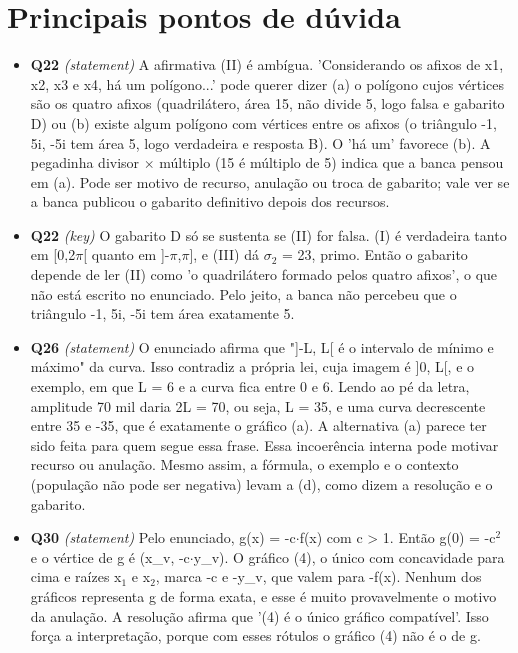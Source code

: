 \documentclass{article}%
\begin{document}
\section*{Principais pontos de dúvida}%
\begin{itemize}%
\item%
\textbf{Q22} \textit{(statement)} A afirmativa (II) é ambígua. 'Considerando os afixos de x1, x2, x3 e x4, há um polígono...' pode querer dizer (a) o polígono cujos vértices são os quatro afixos (quadrilátero, área 15, não divide 5, logo falsa e gabarito D) ou (b) existe algum polígono com vértices entre os afixos (o triângulo -1, 5i, -5i tem área 5, logo verdadeira e resposta B). O 'há um' favorece (b). A pegadinha divisor $\times$ múltiplo (15 é múltiplo de 5) indica que a banca pensou em (a). Pode ser motivo de recurso, anulação ou troca de gabarito; vale ver se a banca publicou o gabarito definitivo depois dos recursos.%
\item%
\textbf{Q22} \textit{(key)} O gabarito D só se sustenta se (II) for falsa. (I) é verdadeira tanto em {[}0,2$\pi${[} quanto em {]}-$\pi$,$\pi${]}, e (III) dá $\sigma$$_{2}$ = 23, primo. Então o gabarito depende de ler (II) como 'o quadrilátero formado pelos quatro afixos', o que não está escrito no enunciado. Pelo jeito, a banca não percebeu que o triângulo -1, 5i, -5i tem área exatamente 5.%
\item%
\textbf{Q26} \textit{(statement)} O enunciado afirma que "{]}-L, L{[} é o intervalo de mínimo e máximo" da curva. Isso contradiz a própria lei, cuja imagem é {]}0, L{[}, e o exemplo, em que L = 6 e a curva fica entre 0 e 6. Lendo ao pé da letra, amplitude 70 mil daria 2L = 70, ou seja, L = 35, e uma curva decrescente entre 35 e -35, que é exatamente o gráfico (a). A alternativa (a) parece ter sido feita para quem segue essa frase. Essa incoerência interna pode motivar recurso ou anulação. Mesmo assim, a fórmula, o exemplo e o contexto (população não pode ser negativa) levam a (d), como dizem a resolução e o gabarito.%
\item%
\textbf{Q30} \textit{(statement)} Pelo enunciado, g(x) = -c$\cdot$f(x) com c > 1. Então g(0) = -c$^2$ e o vértice de g é (x\_v, -c$\cdot$y\_v). O gráfico (4), o único com concavidade para cima e raízes x$_{1}$ e x$_{2}$, marca -c e -y\_v, que valem para -f(x). Nenhum dos gráficos representa g de forma exata, e esse é muito provavelmente o motivo da anulação. A resolução afirma que '(4) é o único gráfico compatível'. Isso força a interpretação, porque com esses rótulos o gráfico (4) não é o de g.%
\end{itemize}%
\end{document}
